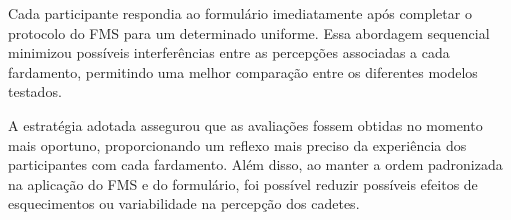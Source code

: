 \tab Cada participante respondia ao formulário imediatamente após completar o protocolo do \acrshort{FMS} para um determinado uniforme. Essa abordagem sequencial minimizou possíveis interferências entre as percepções associadas a cada fardamento, permitindo uma melhor comparação entre os diferentes modelos testados.

A estratégia adotada assegurou que as avaliações fossem obtidas no momento mais oportuno, proporcionando um reflexo mais preciso da experiência dos participantes com cada fardamento. Além disso, ao manter a ordem padronizada na aplicação do \acrshort{FMS} e do formulário, foi possível reduzir possíveis efeitos de esquecimentos ou variabilidade na percepção dos cadetes.